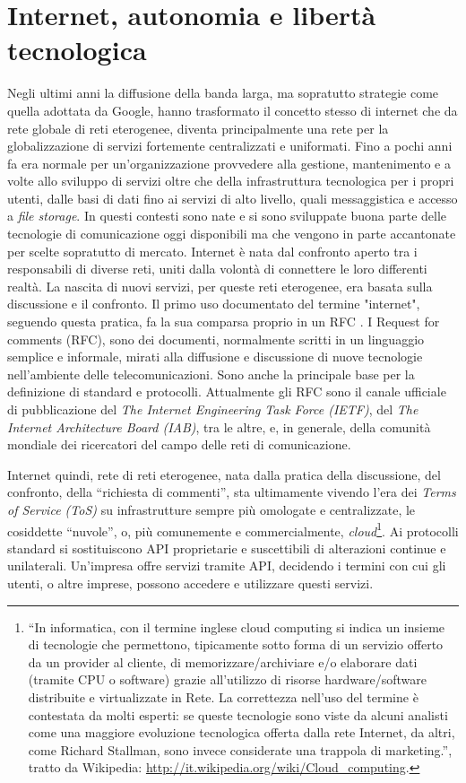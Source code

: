 \section{Internet, autonomia e libertà tecnologica}
Negli ultimi anni la diffusione della banda larga, ma sopratutto
strategie come quella adottata da Google, hanno trasformato il
concetto stesso di internet che da rete globale di reti eterogenee,
diventa principalmente una rete per la globalizzazione di servizi
fortemente centralizzati e uniformati. Fino a pochi anni fa era
normale per un'organizzazione provvedere alla gestione, mantenimento e
a volte allo sviluppo di servizi oltre che della infrastruttura
tecnologica per i propri utenti, dalle basi di dati fino ai servizi di
alto livello, quali messaggistica e accesso a \emph{file storage}. In
questi contesti sono nate e si sono sviluppate buona parte delle
tecnologie di comunicazione oggi disponibili ma che vengono in parte
accantonate per scelte sopratutto di mercato. Internet è nata dal
confronto aperto tra i responsabili di diverse reti, uniti dalla
volontà di connettere le loro differenti realtà. La nascita di nuovi
servizi, per queste reti eterogenee, era basata sulla discussione e il
confronto. Il primo uso documentato del termine "internet", seguendo
questa pratica, fa la sua comparsa proprio in un RFC \citep{RFC675}. I
Request for comments (RFC), sono dei documenti, normalmente scritti in
un linguaggio semplice e informale, mirati alla diffusione e
discussione di nuove tecnologie nell'ambiente delle
telecomunicazioni. Sono anche la principale base per la definizione di
standard e protocolli. Attualmente gli RFC sono il canale ufficiale di
pubblicazione del \emph{The Internet Engineering Task Force (IETF)},
del \emph{The Internet Architecture Board (IAB)}, tra le altre, e, in
generale, della comunità mondiale dei ricercatori del campo delle reti
di comunicazione.

Internet quindi, rete di reti eterogenee, nata dalla pratica della
discussione, del confronto, della ``richiesta di commenti'', sta
ultimamente vivendo l'era dei \emph{Terms of Service (ToS)} su
infrastrutture sempre più omologate e centralizzate, le cosiddette
``nuvole'', o, più comunemente e commercialmente,
\emph{cloud}\footnote{``In informatica, con il termine inglese cloud
  computing si indica un insieme di tecnologie che permettono,
  tipicamente sotto forma di un servizio offerto da un provider al
  cliente, di memorizzare/archiviare e/o elaborare dati (tramite CPU o
  software) grazie all'utilizzo di risorse hardware/software
  distribuite e virtualizzate in Rete.  La correttezza nell'uso del
  termine è contestata da molti esperti: se queste tecnologie sono
  viste da alcuni analisti come una maggiore evoluzione tecnologica
  offerta dalla rete Internet, da altri, come Richard Stallman, sono
  invece considerate una trappola di marketing.'', tratto da
  Wikipedia: \url{http://it.wikipedia.org/wiki/Cloud_computing}.}. Ai
protocolli standard si sostituiscono API proprietarie e suscettibili
di alterazioni continue e unilaterali. Un'impresa offre servizi
tramite API, decidendo i termini con cui gli utenti, o altre imprese,
possono accedere e utilizzare questi servizi.

